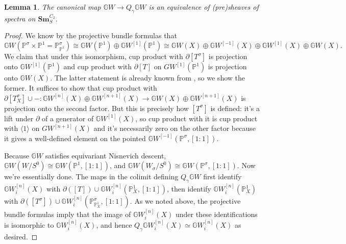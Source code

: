 \documentclass[edeposit,fullpage]{uiucthesis2009}
\newcommand{\mbb}{\mathbb}
\newcommand{\Sm}[1]{\mathbf{Sm}_{#1}}
\theoremstyle{plain}
\newtheorem{lemma}{Lemma}
\numberwithin{lemma}{section}
\theoremstyle{definition}
\newtheorem{remark}[lemma]{Remark}
\begin{document}

\begin{lemma}\label{lem:GWb_eq}
The canonical map $\mbb GW \rightarrow Q_\gamma \mbb GW$ is an
equivalence of (pre)sheaves of spectra on $\Sm{S}^{C_2}$. 
\end{lemma}

\begin{proof}
We know by the projective bundle formulas
that 
\[
\mbb GW(\mbb P^\sigma \times \mbb P^1 = \mbb
P^\sigma_{\mbb P^1}) \cong \mbb GW(\mbb P^1) \oplus \mbb GW^{[1]}(\mbb
P^1) \cong \mbb GW(X) \oplus \mbb GW^{[-1]}(X) \oplus \mbb
GW^{[1]}(X) \oplus \mbb GW(X).
\]
We claim that under this isomorphism, cup product with
$\partial [T^\sigma]$ is projection onto $\mbb
GW^{[1]}(\mbb P^1)$ and cup product with $\partial [T]$ on
$GW^{[1]}(\mbb P^1)$ is projection
onto $\mbb GW(X)$. The latter statement is already known from
\cite[Theorem 9.10]{Schder}, so we show the former. It suffices to show that cup
product with $\partial [T^\sigma_{X}] \cup - : \mbb GW^{[n]}(X) \oplus
\mbb GW^{[n+1]}(X) \rightarrow \mbb GW(X) \oplus \mbb GW^{[n+1]}(X)$ is projection
onto the second factor. But this is precisely how $[T^\sigma]$ is
defined: it's a lift under $\partial$ of a generator of $\mbb
GW^{[1]}(X)$, so cup product with it is cup product with $\langle 1
\rangle$ on $GW^{[n+1]}(X)$
and it's necessarily zero on the other factor because it gives a
well-defined element on
the pointed $\mbb GW^{[-1]}(\mbb P^\sigma,[1:1])$. 

 
Because $\mbb GW$ satisfies equivariant Nisnevich descent, $\mbb
GW(W/S^0) \cong \mbb GW(\mbb P^1,[1:1])$, and $\mbb GW(W_\sigma/S^0)
\cong \mbb GW(\mbb P^\sigma,[1:1])$. Now we're essentially done. The
maps in the colimit defining $Q_\gamma \mbb GW$ first identify $\mbb GW_i^{[n]}(X)$
with $\partial([T]) \cup \mbb GW_i^{[n]}(\mbb P^1_X,[1:1])$, then identify
$\mbb GW_i^{[n]}(\mbb P^1_X)$ with  $\partial([T^\sigma]) \cup
\mbb GW_i^{[n]}(\mbb P^\sigma_{\mbb P^1_X},[1:1])$. As we noted above,
the projective bundle formulas imply that the image of $\mbb GW_i^{[n]}(X)$ under these identifications is isomorphic
to $\mbb GW_i^{[n]}(X)$, and hence $Q_\gamma\mbb GW_i^{[n]}(X) \simeq \mbb
GW_i^{[n]}(X)$ as desired.


\end{proof}
\end{document}
